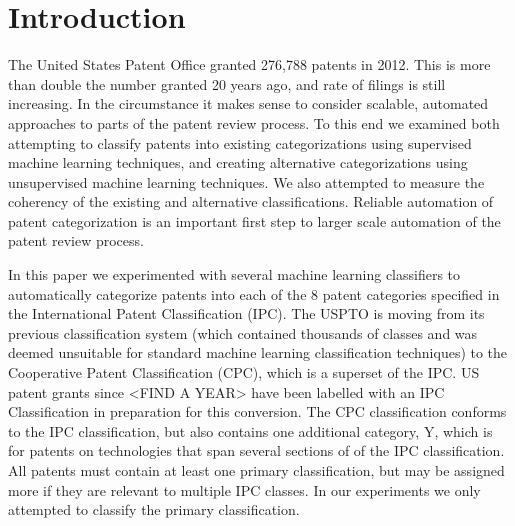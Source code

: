 \section{Introduction}
\indent
The United States Patent Office granted 276,788 patents in 2012\cite{USPTO:2013:stats}. This is more than double the number granted 20 years ago, and rate of filings is still increasing. In the circumstance it makes sense to consider scalable, automated approaches to parts of the patent review process. To this end we examined both attempting to classify patents into existing categorizations using supervised machine learning techniques, and creating alternative categorizations using unsupervised machine learning techniques. We also attempted to measure the coherency of the existing and alternative classifications. Reliable automation of patent categorization is an important first step to larger scale automation of the patent review process.

In this paper we experimented with several machine learning classifiers to automatically categorize patents into each of the 8 patent categories specified in the International Patent Classification\cite{ipc:2013:guide} (IPC). The USPTO is moving from its previous classification system (which contained thousands of classes and was deemed unsuitable for standard machine learning classification techniques) to the Cooperative Patent Classification (CPC), which is a superset of the IPC. US patent grants since <FIND A YEAR> have been labelled with an IPC Classification in preparation for this conversion. The CPC classification conforms to the IPC classification, but also contains one additional category, Y, which is for patents on technologies that span several sections of of the IPC classification. All patents must contain at least one primary classification, but may be assigned more if they are relevant to multiple IPC classes. In our experiments we only attempted to classify the primary classification.



